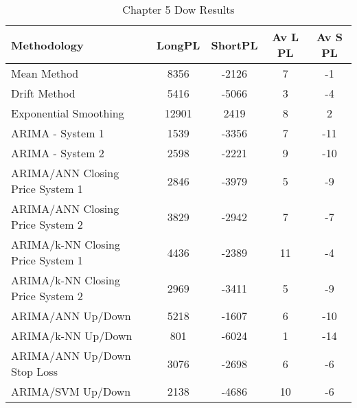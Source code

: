 \begin{table}[ht]
\centering
\caption[Chapter 5 Dow Results]{Chapter 5 Dow Results} 
\label{tab:chp6:dow2_summary}
\begin{tabular}{lcccc}
  \toprule Methodology & LongPL & ShortPL & Av L PL & Av S PL \\ 
  \midrule Mean Method & 8356 & -2126 & 7 & -1 \\ 
  Drift Method & 5416 & -5066 & 3 & -4 \\ 
  Exponential Smoothing & 12901 & 2419 & 8 & 2 \\ 
  ARIMA - System 1 & 1539 & -3356 & 7 & -11 \\ 
  ARIMA - System 2 & 2598 & -2221 & 9 & -10 \\ 
  ARIMA/ANN Closing Price System 1 & 2846 & -3979 & 5 & -9 \\ 
  ARIMA/ANN Closing Price System 2 & 3829 & -2942 & 7 & -7 \\ 
  ARIMA/k-NN Closing Price System 1 & 4436 & -2389 & 11 & -4 \\ 
  ARIMA/k-NN Closing Price System 2 & 2969 & -3411 & 5 & -9 \\ 
  ARIMA/ANN Up/Down & 5218 & -1607 & 6 & -10 \\ 
  ARIMA/k-NN Up/Down & 801 & -6024 & 1 & -14 \\ 
  ARIMA/ANN Up/Down Stop Loss & 3076 & -2698 & 6 & -6 \\ 
  ARIMA/SVM Up/Down & 2138 & -4686 & 10 & -6 \\ 
   \bottomrule \end{tabular}
\end{table}
